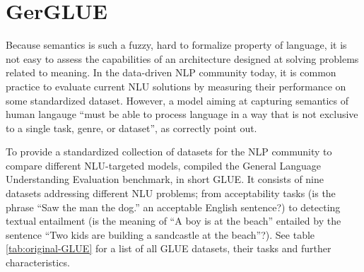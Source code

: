 \label{chap:3_datasets}


\section{GerGLUE}

Because semantics is such a fuzzy, hard to formalize property of language, it is not easy to
assess the capabilities of an architecture designed at solving problems related to meaning. In
the data-driven NLP community today, it is common practice to evaluate current NLU solutions by
measuring their performance on some standardized dataset. However, a model aiming at capturing
semantics of human langauge ``must be able to process language in a way that is not exclusive
to a single task, genre, or dataset'', as \cite{wang2018glue} correctly point out.

To provide a standardized collection of datasets for the NLP community to compare different NLU-targeted
models, \citeauthor{wang2018glue} compiled the General Language Understanding Evaluation benchmark, in short
GLUE. It consists of nine datasets addressing different NLU problems; from acceptability
tasks (is the phrase ``Saw the man the dog.'' an acceptable English sentence?) to detecting
textual entailment (is the meaning of ``A boy is at the beach'' entailed by the sentence
``Two kids are building a sandcastle at the beach''?). See table \ref{tab:original-GLUE} for
a list of all GLUE datasets, their tasks and further characteristics.


